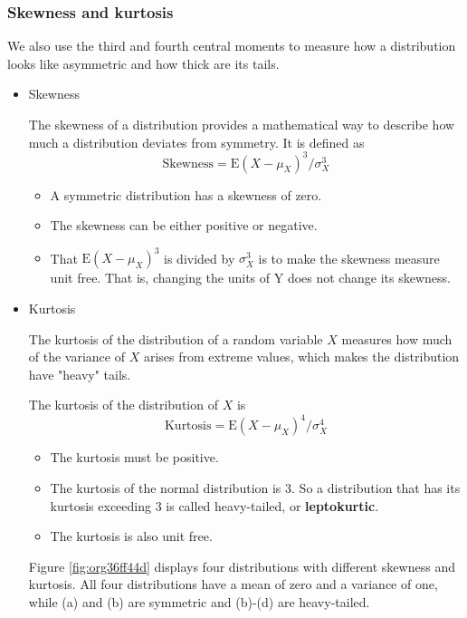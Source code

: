 \documentclass[a4paper,11pt]{article}
\begin{document}
\subsubsection*{Skewness and kurtosis}
\label{sec:org4167f66}

We also use the third and fourth central moments to measure how a
distribution looks like asymmetric and how thick are its tails.

\begin{itemize}
\item Skewness
\label{sec:org51e6dd5}

The skewness of a distribution provides a mathematical way to describe
how much a distribution deviates from symmetry. It is defined as
\[ \text{Skewness} =  \mathrm{E}(X - \mu_X)^{3}/\sigma_{X}^{3} \]

\begin{itemize}
\item A symmetric distribution has a skewness of zero.
\item The skewness can be either positive or negative.
\item That \(\mathrm{E}(X - \mu_X)^3\) is divided by \(\sigma^3_X\) is to make the
skewness measure unit free. That is, changing the units of Y does
not change its skewness.
\end{itemize}

\item Kurtosis
\label{sec:orge202582}

The kurtosis of the distribution of a random variable \(X\) measures how
much of the variance of \(X\) arises from extreme values, which makes
the distribution have "heavy" tails.

The kurtosis of the distribution of \(X\) is
\[ \text{Kurtosis} = \mathrm{E}(X - \mu_X)^{4}/\sigma_{X}^{4} \]

\begin{itemize}
\item The kurtosis must be positive.
\item The kurtosis of the normal distribution is 3. So a distribution that
has its kurtosis exceeding 3 is called heavy-tailed, or
\textbf{leptokurtic}.
\item The kurtosis is also unit free.
\end{itemize}

Figure \ref{fig:org36ff44d} displays four distributions with different
skewness and kurtosis. All four distributions have a mean of zero and
a variance of one, while (a) and (b) are symmetric and (b)-(d) are
heavy-tailed.


\end{itemize}
\end{document}
